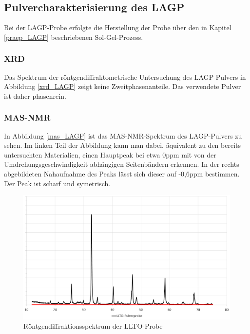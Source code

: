 \documentclass[a4paper, 11pt, headsepline,footsepline,twoside,abstract]{scrbook}
\begin{document}
\subsection{Pulvercharakterisierung des LAGP}
Bei der LAGP-Probe erfolgte die Herstellung der Probe über den in Kapitel \ref{praep_LAGP} beschriebenen Sol-Gel-Prozess. 
\subsubsection{XRD}
Das Spektrum der röntgendiffraktometrische Untersuchung des LAGP-Pulvers in Abbildung \ref{xrd_LAGP} zeigt keine Zweitphasenanteile. Das verwendete Pulver ist daher phasenrein.
\subsubsection{MAS-NMR}
In Abbildung \ref{mas_LAGP} ist das MAS-NMR-Spektrum des LAGP-Pulvers zu sehen. Im linken Teil der Abbildung kann man dabei, äquivalent zu den bereits untersuchten Materialien, einen Hauptpeak bei etwa 0ppm mit von der Umdrehungsgeschwindigkeit abhängigen Seitenbändern erkennen. In der rechts abgebildeten Nahaufnahme des Peaks lässt sich dieser auf -0,6ppm bestimmen. Der Peak ist scharf und symetrisch.
\newpage
\begin{figure}
	\centering
	\includegraphics[width=1.0\columnwidth]{images/XRD_LLTO.png}
	\caption{Röntgendiffraktionsspektrum der LLTO-Probe}
	\label{xrd_LLTO}
\end{figure}
\end{document}
